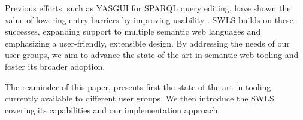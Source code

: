 
Previous efforts, such as YASGUI for SPARQL query editing, have shown the value of lowering entry barriers by improving usability \cite{10.3233/SW-150197,10.1007/978-3-642-41242-4_7}. 
SWLS builds on these successes, expanding support to multiple semantic web languages and emphasizing a user-friendly, extensible design. 
By addressing the needs of our user groups, we aim to advance the state of the art in semantic web tooling and foster its broader adoption.

The reaminder of this paper, presents first the state of the art in tooling currently available to different user groups.
We then introduce the SWLS covering its capabilities and our implementation approach.
